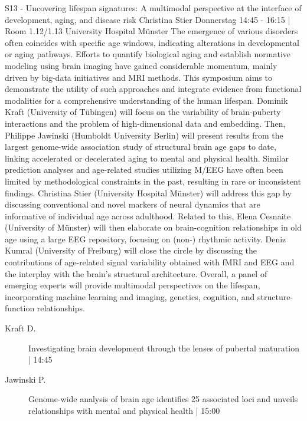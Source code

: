 
            \begin{symposium}
            {S13 - Uncovering lifespan signatures: A multimodal perspective at the interface of development, aging, and disease risk }
            {Christina Stier}
            {Donnerstag 14:45 - 16:15 | Room 1.12/1.13}
            {University Hospital Münster}
            The emergence of various disorders often coincides with specific age windows, indicating alterations in developmental or aging pathways. Efforts to quantify biological aging and establish normative modeling using brain imaging have gained considerable momentum, mainly driven by big-data initiatives and MRI methods. This symposium aims to demonstrate the utility of such approaches and integrate evidence from functional modalities for a comprehensive understanding of the human lifespan.
Dominik Kraft (University of Tübingen) will focus on the variability of brain-puberty interactions and the problem of high-dimensional data and embedding. Then, Philippe Jawinski (Humboldt University Berlin) will present results from the largest genome-wide association study of structural brain age gaps to date, linking accelerated or decelerated aging to mental and physical health. Similar prediction analyses and age-related studies utilizing M/EEG have often been limited by methodological constraints in the past, resulting in rare or inconsistent findings. Christina Stier (University Hospital Münster) will address this gap by discussing conventional and novel markers of neural dynamics that are informative of individual age across adulthood. Related to this, Elena Cesnaite (University of Münster) will then elaborate on brain-cognition relationships in old age using a large EEG repository, focusing on (non-) rhythmic activity. Deniz Kumral (University of Freiburg) will close the circle by discussing the contributions of age-related signal variability obtained with fMRI and EEG and the interplay with the brain’s structural architecture.
Overall, a panel of emerging experts will provide multimodal perspectives on the lifespan, incorporating machine learning and imaging, genetics, cognition, and structure-function relationships.
            \begin{description}    
            
                \item [ Kraft D.] Investigating brain development through the lenses of pubertal maturation \textcolor{mygray}{ | 14:45}    
                
                \item [ Jawinski P.] Genome-wide analysis of brain age identifies 25 associated loci and unveils relationships with mental and physical health \textcolor{mygray}{ | 15:00}    
                

\end{description}
\end{symposium}
